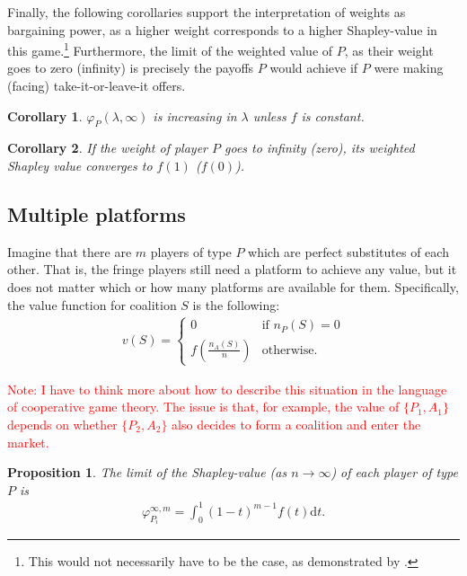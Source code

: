 \documentclass[a4paper]{article}
\newtheorem{proposition}{Proposition}
\newtheorem{corollary}{Corollary}
\newcommand{\dt}{\mathrm{d}t}
\begin{document}
Finally, the following corollaries support the interpretation of weights as bargaining power, as a higher weight corresponds to a higher Shapley-value in this game.\footnote{This would not necessarily have to be the case, as demonstrated by \textcite{owen1968communications}.} Furthermore, the limit of the weighted value of $P$, as their weight goes to zero (infinity) is precisely the payoffs $P$ would achieve if $P$ were making (facing) take-it-or-leave-it offers.

\begin{corollary}
    \label{cor:platform_value_weighted}
    $\varphi_P(\lambda, \infty)$ is increasing in $\lambda$ unless $f$ is constant.
\end{corollary}

\begin{corollary}
    \label{cor:paltform_value_weighted_2}
    If the weight of player $P$ goes to infinity (zero), its weighted Shapley value converges to $f(1)$ ($f(0)$).
\end{corollary}

\subsection{Multiple platforms}

Imagine that there are $m$ players of type $P$ which are perfect substitutes of each other. That is, the fringe players still need a platform to achieve any value, but it does not matter which or how many platforms are available for them. Specifically, the value function for coalition $S$ is the following:
\begin{align*}
    v(S) = \begin{cases}
        0                              & \text{if } n_P(S) = 0 \\
        f\left(\frac{n_A(S)}{n}\right) & \text{otherwise}.
    \end{cases}
\end{align*}

\textcolor{red}{Note: I have to think more about how to describe this situation in the language of cooperative game theory. The issue is that, for example, the value of $\{P_1, A_1\}$ depends on whether $\{P_2, A_2\}$ also decides to form a coalition and enter the market.}

\begin{proposition}
    \label{prop:multiple_platforms}
    The limit of the Shapley-value (as $n \to \infty$) of each player of type $P$ is
    \begin{align*}
        \varphi_{P_i}^{\infty, m} = \int_0^1 (1-t) ^ {m-1} f(t) \dt .
    \end{align*}
\end{proposition}
\end{document}
